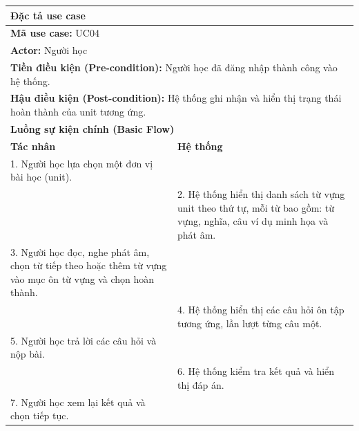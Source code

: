 \documentclass[a4paper,12pt]{extreport}
\begin{document}
\begin{table}[!ht]
    \centering
    \renewcommand{\arraystretch}{1.1} %
    \begin{tabularx}{\linewidth}{|X|X|}
        \hline
        \multicolumn{2}{|l|}{\textbf{Đặc tả use case}} \\ \hline
        \multicolumn{2}{|l|}{\textbf{Mã use case:} UC04} \\ \hline
        \multicolumn{2}{|l|}{\textbf{Actor:} Người học} \\ \hline
        \multicolumn{2}{|p{\dimexpr\linewidth-2\tabcolsep-2\arrayrulewidth}|}{\textbf{Tiền điều kiện (Pre-condition):} Người học đã đăng nhập thành công vào hệ thống.} \\ \hline
        \multicolumn{2}{|p{\dimexpr\linewidth-2\tabcolsep-2\arrayrulewidth}|}{\textbf{Hậu điều kiện (Post-condition):} Hệ thống ghi nhận và hiển thị trạng thái hoàn thành của unit tương ứng.} \\ \hline
        \multicolumn{2}{|l|}{\textbf{Luồng sự kiện chính (Basic Flow)}} \\ \hline
        \textbf{Tác nhân} & \textbf{Hệ thống} \\ \hline
        
        1. Người học lựa chọn một đơn vị bài học (unit). & \\ \hline
        
        & 2. Hệ thống hiển thị danh sách từ vựng unit theo thứ tự, mỗi từ bao gồm: từ vựng, nghĩa, câu ví dụ minh họa và phát âm. \\ \hline
        
        3. Người học đọc, nghe phát âm, chọn từ tiếp theo hoặc thêm từ vựng vào mục ôn từ vựng và chọn hoàn thành. & \\ \hline
        
        & 4. Hệ thống hiển thị các câu hỏi ôn tập tương ứng, lần lượt từng câu một. \\ \hline
        
        5. Người học trả lời các câu hỏi và nộp bài. & \\ \hline
        
        & 6. Hệ thống kiểm tra kết quả và hiển thị đáp án. \\ \hline
        
        7. Người học xem lại kết quả và chọn tiếp tục. & \\ \hline
        

\end{tabularx}
\end{table}
\end{document}
